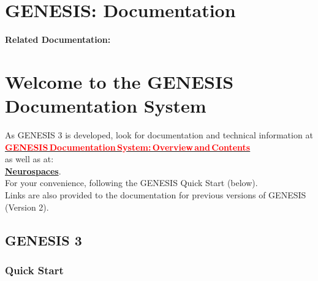 \documentclass[12pt]{article}
\begin{document}
\section*{GENESIS: Documentation}

{\bf Related Documentation:}

\section*{Welcome to the GENESIS Documentation System}

As GENESIS 3 is developed, look for documentation and technical information at \\

\href{../documentation-overview/documentation-overview.tex}{\textcolor{red}{\bf GENESIS\,Documentation\,System:\,Overview\,and\,Contents}} \\

\noindent as well as at: \\

\href{http://www.neurospaces.org}{\bf Neurospaces}. \\

For your convenience, following the GENESIS Quick Start (below). \\

Links are also provided to the documentation for previous versions of GENESIS (Version 2).

\subsection*{GENESIS 3}

\subsubsection*{Quick Start}
\end{document}

